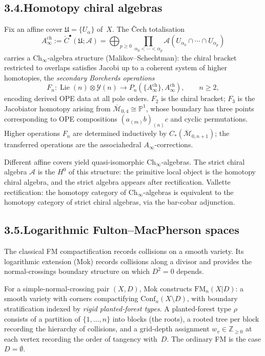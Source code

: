 \documentclass[11pt]{report}
\theoremstyle{definition}
\theoremstyle{remark}
\providecommand{\cA}{\mathcal{A}}
\providecommand{\cY}{\mathcal{Y}}
\numberwithin{equation}{section}
\begin{document}
\subsection*{3.4.\enspace Homotopy chiral algebras}

Fix an affine cover $\mathfrak U=\{U_\alpha\}$ of~$X$. The \v Cech
totalisation
\[
A^{\mathrm{ch}}_\infty:=\check C^\bullet(\mathfrak U;\cA)=\bigoplus_{p\ge 0}\prod_{\alpha_0<\cdots<\alpha_p}\cA(U_{\alpha_0}\cap\cdots\cap U_{\alpha_p})
\]
carries a $\mathrm{Ch}_\infty$-algebra structure (Malikov--Schechtman):
the chiral bracket restricted to overlaps satisfies Jacobi up to a
coherent system of higher homotopies, the \emph{secondary Borcherds
operations}
\[
F_n\colon\operatorname{Lie}(n)\otimes\cY(n)\to P_n(\{A^{\mathrm{ch}}_\infty\},A^{\mathrm{ch}}_\infty),\qquad n\ge 2,
\]
encoding derived OPE data at all pole orders. $F_2$ is the chiral
bracket; $F_3$ is the Jacobiator homotopy arising from
$\overline{\mathcal M}_{0,4}\cong\mathbb P^1$, whose boundary has
three points corresponding to OPE compositions
$(a_{(m)}b)_{(n)}c$ and cyclic permutations. Higher operations $F_n$
are determined inductively by $C_*(\overline{\mathcal M}_{0,n+1})$;
the transferred operations are the associahedral $A_\infty$-corrections.

Different affine covers yield quasi-isomorphic $\mathrm{Ch}_\infty$-algebras.
The strict chiral algebra $\cA$ is the $H^0$ of this structure: the
primitive local object is the homotopy chiral algebra, and the strict
algebra appears after rectification. Vallette rectification: the
homotopy category of $\mathrm{Ch}_\infty$-algebras is equivalent to
the homotopy category of strict chiral algebras, via the bar-cobar
adjunction.

\subsection*{3.5.\enspace Logarithmic Fulton--MacPherson spaces}

The classical FM compactification records collisions on a smooth
variety. Its logarithmic extension (Mok) records collisions along a
divisor and provides the normal-crossings boundary structure on which
$D^2=0$ depends.

For a simple-normal-crossing pair $(X,D)$, Mok constructs
$\mathrm{FM}_n(X|D)$: a smooth variety with corners compactifying
$\mathrm{Conf}_n(X\setminus D)$, with boundary stratification indexed
by \emph{rigid planted-forest types}. A planted-forest type $\rho$
consists of a partition of $\{1,\ldots,n\}$ into blocks (the roots),
a rooted tree per block recording the hierarchy of collisions, and a
grid-depth assignment $w_v\in\mathbb Z_{\ge 0}$ at each vertex
recording the order of tangency with~$D$. The ordinary FM is the
case $D=\emptyset$.
\end{document}
